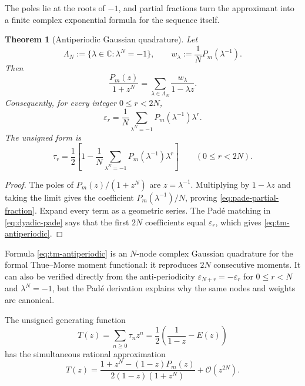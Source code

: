 \documentclass[11pt]{article}
\newtheorem{theorem}{Theorem}[section]
\theoremstyle{definition}
\theoremstyle{remark}
\newcommand{\C}{\mathbb C}
\newcommand{\eps}{\varepsilon}
\newcommand{\bigO}{\mathcal O}
\begin{document}
The poles lie at the roots of \(-1\), and partial fractions turn the approximant into a
finite complex exponential formula for the sequence itself.

\begin{theorem}[Antiperiodic Gaussian quadrature]
\label{thm:antiperiodic-quadrature}
Let
\begin{equation}
 \Lambda_N:=\{\lambda\in\C:\lambda^N=-1\},
 \qquad
 w_\lambda:=\frac1N P_m(\lambda^{-1}).                     \label{eq:lambda-weights}
\end{equation}
Then
\begin{equation}
 \frac{P_m(z)}{1+z^N}
 =\sum_{\lambda\in\Lambda_N}\frac{w_\lambda}{1-\lambda z}.
                                                               \label{eq:pade-partial-fraction}
\end{equation}
Consequently, for every integer \(0\le r<2N\),
\begin{equation}
\boxed{
 \eps_r=\frac1N\sum_{\lambda^N=-1}
 P_m(\lambda^{-1})\lambda^r.}                              \label{eq:tm-antiperiodic}
\end{equation}
The unsigned form is
\begin{equation}
 \tau_r=\frac12\left[1-\frac1N\sum_{\lambda^N=-1}
 P_m(\lambda^{-1})\lambda^r\right]
 \qquad(0\le r<2N).                                       \label{eq:tau-antiperiodic}
\end{equation}
\end{theorem}

\begin{proof}
The poles of \(P_m(z)/(1+z^N)\) are \(z=\lambda^{-1}\).  Multiplying by
\(1-\lambda z\) and taking the limit gives the coefficient
\(P_m(\lambda^{-1})/N\), proving \eqref{eq:pade-partial-fraction}.  Expand every term as
a geometric series.  The Pad\'e matching in \eqref{eq:dyadic-pade} says that the first
\(2N\) coefficients equal \(\eps_r\), which gives \eqref{eq:tm-antiperiodic}.
\end{proof}

Formula \eqref{eq:tm-antiperiodic} is an \(N\)-node complex Gaussian quadrature for the
formal Thue--Morse moment functional: it reproduces \(2N\) consecutive moments.  It can
also be verified directly from the anti-periodicity
\(\eps_{N+r}=-\eps_r\) for \(0\le r<N\) and
\(\lambda^N=-1\), but the Pad\'e derivation explains why the same nodes and weights are
canonical.

The unsigned generating function
\begin{equation}
 T(z)=\sum_{n\ge0}\tau_nz^n=\frac12\left(\frac1{1-z}-E(z)\right)                 \label{eq:T-repeat}
\end{equation}
has the simultaneous rational approximation
\begin{equation}
\boxed{
 T(z)=
 \frac{1+z^N-(1-z)P_m(z)}{2(1-z)(1+z^N)}
 +\bigO(z^{2N}).}                                           \label{eq:tau-pade}
\end{equation}
\end{document}
